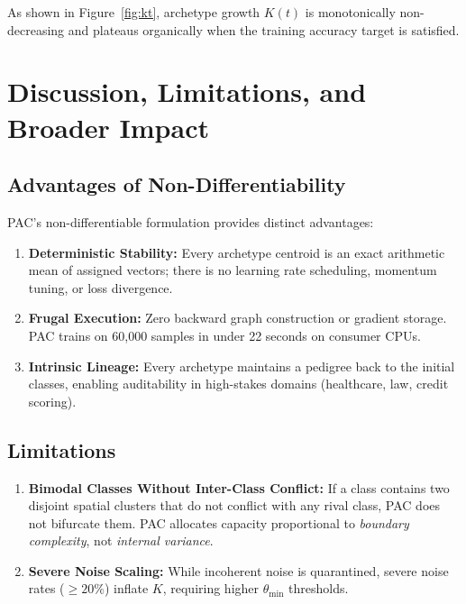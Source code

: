 \documentclass[11pt,a4paper]{article}
\begin{document}
As shown in Figure~\ref{fig:kt}, archetype growth $K(t)$ is monotonically non-decreasing and plateaus organically when the training accuracy target is satisfied.

\section{Discussion, Limitations, and Broader Impact}
\label{sec:discussion}

\subsection{Advantages of Non-Differentiability}
PAC's non-differentiable formulation provides distinct advantages:
\begin{enumerate}
    \item \textbf{Deterministic Stability:} Every archetype centroid is an exact arithmetic mean of assigned vectors; there is no learning rate scheduling, momentum tuning, or loss divergence.
    \item \textbf{Frugal Execution:} Zero backward graph construction or gradient storage. PAC trains on 60,000 samples in under 22 seconds on consumer CPUs.
    \item \textbf{Intrinsic Lineage:} Every archetype maintains a pedigree back to the initial classes, enabling auditability in high-stakes domains (healthcare, law, credit scoring).
\end{enumerate}

\subsection{Limitations}
\begin{enumerate}
    \item \textbf{Bimodal Classes Without Inter-Class Conflict:} If a class contains two disjoint spatial clusters that do not conflict with any rival class, PAC does not bifurcate them. PAC allocates capacity proportional to \textit{boundary complexity}, not \textit{internal variance}.
    \item \textbf{Severe Noise Scaling:} While incoherent noise is quarantined, severe noise rates ($\ge 20\%$) inflate $K$, requiring higher $\theta_{\text{min}}$ thresholds.
\end{enumerate}
\end{document}
